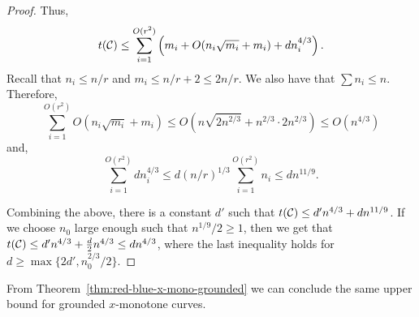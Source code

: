 \documentclass[11pt]{article}
\newtheorem{theorem}{Theorem}
\theoremstyle{definition}
\def\C{{\cal C}}
\begin{document}
\begin{proof}
	Thus,
	\begin{equation}
		t(\C) \le \sum_{i=1}^{O(r^2)} \left(m_i +O(n_i\sqrt{m_i}+m_i) + d n_i^{4/3} \right).
	\end{equation}
	Recall that $n_i \le n/r$ and $m_i \le n/r+2 \le 2n/r$.
	We also have that $\sum n_i \le n$. Therefore, 
	\begin{equation}
		\sum_{i=1}^{O(r^2)} O(n_i\sqrt{m_i}+m_i) \le O(n\sqrt{2n^{2/3}} + n^{2/3}\cdot2n^{2/3}) \le O(n^{4/3})
	\end{equation}
	and,
	\begin{equation}
		\sum_{i=1}^{O(r^2)} dn_i^{4/3} \le d(n/r)^{1/3} \sum_{i=1}^{O(r^2)} n_i \le dn^{11/9}.
	\end{equation}
	
	Combining the above, there is a constant $d'$ such that $t(\C) \le d'n^{4/3} + d n^{11/9} $.
	If we choose $n_0$ large enough such that $n^{1/9}/2 \ge 1$, then we get that
	$t(\C) \le d'n^{4/3} + \frac{d}{2} n^{4/3} \le dn^{4/3}$, where the last inequality holds for $d \ge \max\{2d', n_0^{2/3}/2\}$.
\end{proof}

	From Theorem~\ref{thm:red-blue-x-mono-grounded} we can conclude the same upper bound for grounded $x$-monotone curves.

\groundedXmonThm*
\end{document}
